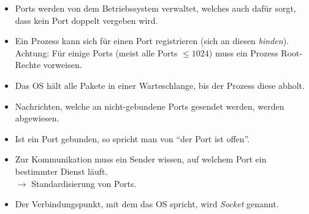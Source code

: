 \documentclass[a4paper, 11pt, accentcolor = tud3b]{tudreport}
\begin{document}
            \begin{itemize}
            	\item Ports werden von dem Betriebssystem verwaltet, welches auch dafür sorgt, dass kein Port doppelt vergeben wird.
            	\item Ein Prozess kann sich für einen Port registrieren (sich an diesen \textit{binden}). \\ Achtung: Für einige Ports (meist alle Ports \( \leq 1024 \)) muss ein Prozess Root-Rechte vorweisen.
            	\item Das OS hält alle Pakete in einer Warteschlange, bis der Prozess diese abholt.
            	\item Nachrichten, welche an nicht-gebundene Ports gesendet werden, werden abgewiesen.
            	\item Ist ein Port gebunden, so spricht man von \enquote{der Port ist offen}.
            	\item Zur Kommunikation muss ein Sender wissen, auf welchem Port ein bestimmter Dienst läuft. \\ \( \rightarrow \) Standardisierung von Ports.
            	\item Der Verbindungspunkt, mit dem das OS spricht, wird \textit{Socket} genannt.
            \end{itemize}
\end{document}
